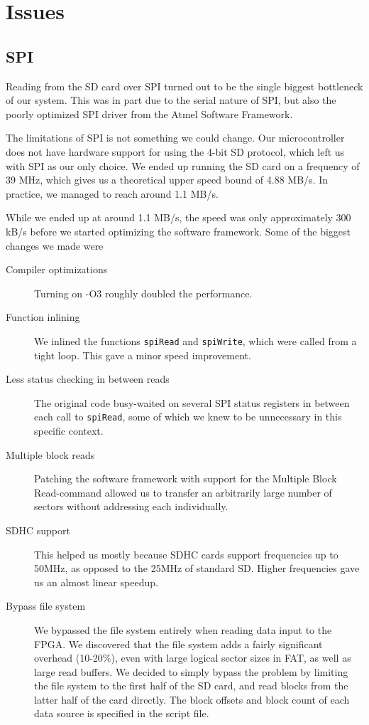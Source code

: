 \section{Issues}

\subsection{SPI}
\label{sec:avr-spi-issues}
Reading from the \ac{SD} card over \ac{SPI} turned out to be the single biggest
bottleneck of our system. This was in part due to the serial nature of \ac{SPI},
but also the poorly optimized \ac{SPI} driver from the Atmel Software Framework.

The limitations of \ac{SPI} is not something we could change. Our
microcontroller does not have hardware support for using the 4-bit \ac{SD}
protocol, which left us with \ac{SPI} as our only choice. We ended up running
the \ac{SD} card on a frequency of 39 MHz, which gives us a theoretical upper
speed bound of 4.88 MB/s. In practice, we managed to reach around 1.1 MB/s.

While we ended up at around 1.1 MB/s, the speed was only approximately 300 kB/s
before we started optimizing the software framework. Some of the biggest changes
we made were
\begin{description}
\item[Compiler optimizations] Turning on -O3 roughly doubled
  the performance.
\item[Function inlining] We inlined the functions {\tt spiRead} and
  {\tt spiWrite}, which were called from a tight loop. This gave a minor speed
  improvement.
\item[Less status checking in between reads] The original code busy-waited on
  several \ac{SPI} status registers in between each call to {\tt spiRead}, some
  of which we knew to be unnecessary in this specific context.
\item[Multiple block reads] Patching the software framework with support for the
  Multiple Block Read-command allowed us to transfer an arbitrarily large number
  of sectors without addressing each individually.
\item[SDHC support] This helped us mostly because \ac{SDHC} cards support
  frequencies up to 50MHz, as opposed to the 25MHz of standard \ac{SD}. Higher
  frequencies gave us an almost linear speedup.
\item[Bypass file system] We bypassed the file system entirely when reading data
  input to the \ac{FPGA}. We discovered that the file system adds a fairly
  significant overhead (10-20\%), even with large logical sector sizes in
  \ac{FAT}, as well as large read buffers. We decided to simply bypass the
  problem by limiting the file system to the first half of the \ac{SD} card, and
  read blocks from the latter half of the card directly. The block offsets and
  block count of each data source is specified in the script file.
\end{description}

